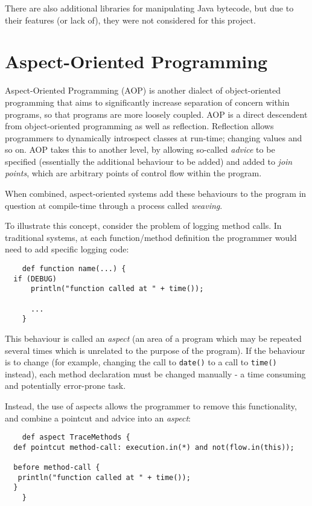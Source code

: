 	There are also additional libraries for manipulating Java bytecode, but due to their features (or lack of), they were not considered for this project.

\section{Aspect-Oriented Programming} \label{sec:instrumentation/alt-instr/aop}
	Aspect-Oriented Programming (AOP) \citep{Kiczales1997} is another dialect of object-oriented programming that aims to significantly increase separation of concern within programs, so that programs are more loosely coupled. AOP is a direct descendent from object-oriented programming as well as reflection. Reflection allows programmers to dynamically introspect classes at run-time; changing values and so on. AOP takes this to another level, by allowing so-called \textit{advice} to be specified (essentially the additional behaviour to be added) and added to \textit{join points}, which are arbitrary points of control flow within the program.
	
	When combined, aspect-oriented systems add these behaviours to the program in question at compile-time through a process called \textit{weaving}.
	
	To illustrate this concept, consider the problem of logging method calls. In traditional systems, at each function/method definition the programmer would need to add specific logging code:
	
	\begin{verbatim}
	def function name(...) {
  if (DEBUG)
      println("function called at " + time());
      
      ...
	}
	\end{verbatim}
	
	This behaviour is called an \textit{aspect} (an area of a program which may be repeated several times which is unrelated to the purpose of the program). If the behaviour is to change (\eg for example, changing the call to \texttt{date()} to a call to \texttt{time()} instead), each method declaration must be changed manually - a time consuming and potentially error-prone task.
	
	Instead, the use of aspects allows the programmer to remove this functionality, and combine a pointcut and advice into an \textit{aspect}:
	
	\begin{verbatim}
	def aspect TraceMethods {
  def pointcut method-call: execution.in(*) and not(flow.in(this));
		
  before method-call {
   println("function called at " + time());
  }
	}
	\end{verbatim}
	
